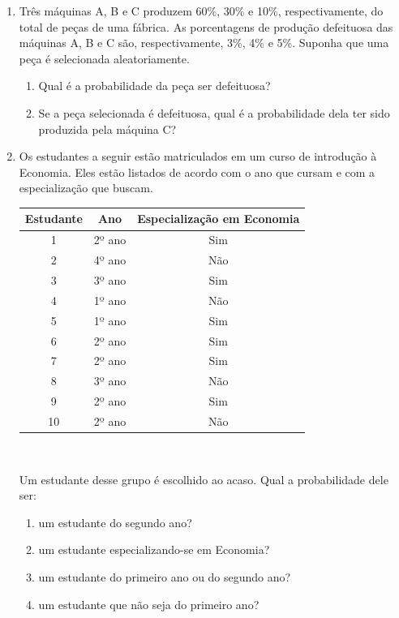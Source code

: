 \documentclass{article}
\begin{document}
\begin{enumerate}
    \item Três máquinas A, B e C produzem 60\%, 30\% e 10\%, respectivamente, do total de peças de uma fábrica. As porcentagens de produção defeituosa das máquinas A, B e C são, respectivamente, 3\%, 4\% e 5\%. Suponha que uma peça é selecionada aleatoriamente. 
    \begin{enumerate}
	    \item Qual é a probabilidade da peça ser defeituosa?
    	\item Se a peça selecionada é defeituosa, qual é a probabilidade dela ter sido produzida pela máquina C?    
    \end{enumerate}
    

    
    
	\item Os estudantes a seguir estão matriculados em um curso de introdução à Economia. Eles estão listados de acordo com o ano que cursam e com a especialização que buscam.
\begin{center}
	\begin{tabular}{c|cc}
		\hline
		Estudante & Ano & Especialização em Economia \\
		\hline
		1 & 2º ano & Sim \\
		2 & 4º ano & Não \\
		3 & 3º ano & Sim \\
		4 & 1º ano & Não \\
		5 & 1º ano & Sim \\
		6 & 2º ano & Sim \\
		7 & 2º ano & Sim \\
		8 & 3º ano & Não \\
		9 & 2º ano & Sim \\
		10 & 2º ano & Não \\
		\hline
	\end{tabular}\\
\end{center}
	Um estudante desse grupo é escolhido ao acaso. Qual a probabilidade dele ser:
	\begin{enumerate}
		\item um estudante do segundo ano?
		\item um estudante especializando-se em Economia?
		\item um estudante do primeiro ano ou do segundo ano?
		\item um estudante que não seja do primeiro ano?
	\end{enumerate}
	

\end{enumerate}
\end{document}
